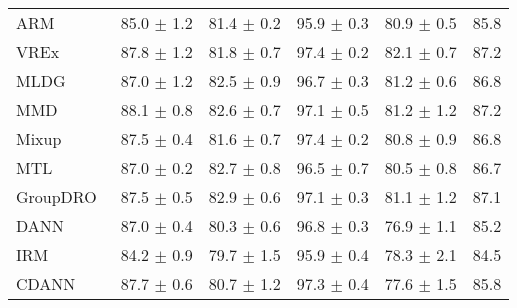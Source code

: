 \documentclass[10pt,twocolumn,letterpaper]{article}
\begin{document}
\begin{table*}[ht]
\begin{center}
{\begin{tabular}{lccccc}
ARM~\cite{zhang2020adaptive}                  & 85.0 $\pm$ 1.2       & 81.4 $\pm$ 0.2       & 95.9 $\pm$ 0.3       & 80.9 $\pm$ 0.5       & 85.8                 \\
VREx~\cite{krueger2020out}                 & 87.8 $\pm$ 1.2       & 81.8 $\pm$ 0.7       & 97.4 $\pm$ 0.2       & 82.1 $\pm$ 0.7       & 87.2                 \\
MLDG~\cite{li2018learning}                 & 87.0 $\pm$ 1.2       & 82.5 $\pm$ 0.9       & 96.7 $\pm$ 0.3       & 81.2 $\pm$ 0.6       & 86.8                 \\
MMD~\cite{li2018domain}                  & 88.1 $\pm$ 0.8       & 82.6 $\pm$ 0.7       & 97.1 $\pm$ 0.5       & 81.2 $\pm$ 1.2       & 87.2                 \\
Mixup~\cite{yan2020improve}                & 87.5 $\pm$ 0.4       & 81.6 $\pm$ 0.7       & 97.4 $\pm$ 0.2       & 80.8 $\pm$ 0.9       & 86.8                 \\
MTL~\cite{blanchard2017domain}                  & 87.0 $\pm$ 0.2       & 82.7 $\pm$ 0.8       & 96.5 $\pm$ 0.7       & 80.5 $\pm$ 0.8       & 86.7                 \\
GroupDRO~\cite{sagawa2019distributionally}             & 87.5 $\pm$ 0.5       & 82.9 $\pm$ 0.6       & 97.1 $\pm$ 0.3       & 81.1 $\pm$ 1.2       & 87.1                 \\
DANN~\cite{ganin2016domain}                 & 87.0 $\pm$ 0.4       & 80.3 $\pm$ 0.6       & 96.8 $\pm$ 0.3       & 76.9 $\pm$ 1.1       & 85.2                 \\
IRM~\cite{arjovsky2019invariant}                  & 84.2 $\pm$ 0.9       & 79.7 $\pm$ 1.5       & 95.9 $\pm$ 0.4       & 78.3 $\pm$ 2.1       & 84.5                 \\
CDANN~\cite{li2018deep}                & 87.7 $\pm$ 0.6       & 80.7 $\pm$ 1.2       & 97.3 $\pm$ 0.4       & 77.6 $\pm$ 1.5       & 85.8                 \\
\bottomrule
\end{tabular}}
\end{center}
\end{table*}
\end{document}
